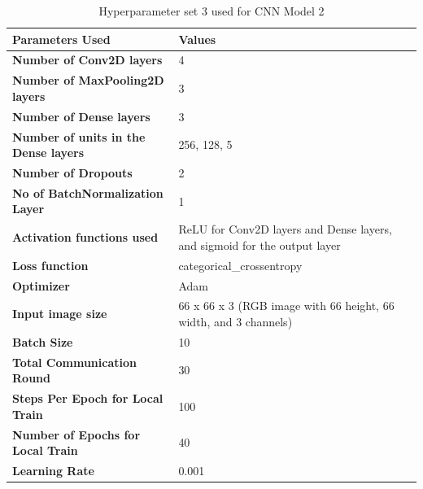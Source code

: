 \begin{table}[!ht]
\caption{Hyperparameter set 3 used for CNN Model 2}
\centering
\begin{tabular}{p{6cm}p{6cm}}
\hline
\small \textbf{Parameters Used} & \small \textbf{Values}  \\
\hline
\small \textbf{Number of Conv2D layers} & \small 4 \\ 

\small \textbf{Number of MaxPooling2D layers} & \small 3  \\

\small \textbf{Number of Dense layers} & \small 3 \\

\small \textbf{Number of units in the Dense layers} & \small 256, 128, 5 \\
\small \textbf{Number of Dropouts} & \small 2 \\
\small \textbf{No of BatchNormalization Layer} & \small 1 \\

\small \textbf{Activation functions used} & \small ReLU for Conv2D layers and Dense layers, and sigmoid for the output layer \\ 

\small \textbf{Loss function} & \small categorical_crossentropy \\ 

\small \textbf{Optimizer} & \small Adam \\ 

\small \textbf{Input image size} & \small 66 x 66 x 3 (RGB image with 66 height, 66 width, and 3 channels) \\ 

\small \textbf{Batch Size} & \small 10 \\ 

\small \textbf{Total Communication Round} & \small 30 \\ 

\small \textbf{Steps Per Epoch for Local Train} & \small 100 \\ 

\small \textbf{Number of Epochs for Local Train} & \small 40 \\ 

\small \textbf{Learning Rate} & \small 0.001 \\ 
\hline
\end{tabular}
\label{table:hyperparameters}
\end{table}

\clearpage

